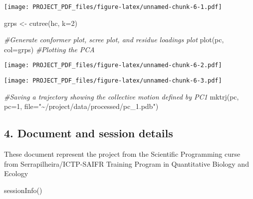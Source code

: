 \documentclass[
]{article}
\newenvironment{Shaded}{\begin{snugshade}}{\end{snugshade}}
\newcommand{\AttributeTok}[1]{\textcolor[rgb]{0.77,0.63,0.00}{#1}}
\newcommand{\CommentTok}[1]{\textcolor[rgb]{0.56,0.35,0.01}{\textit{#1}}}
\newcommand{\DecValTok}[1]{\textcolor[rgb]{0.00,0.00,0.81}{#1}}
\newcommand{\FunctionTok}[1]{\textcolor[rgb]{0.00,0.00,0.00}{#1}}
\newcommand{\NormalTok}[1]{#1}
\newcommand{\OtherTok}[1]{\textcolor[rgb]{0.56,0.35,0.01}{#1}}
\newcommand{\SpecialCharTok}[1]{\textcolor[rgb]{0.00,0.00,0.00}{#1}}
\newcommand{\StringTok}[1]{\textcolor[rgb]{0.31,0.60,0.02}{#1}}
\begin{document}
\texttt{[image: PROJECT\_PDF\_files/figure-latex/unnamed-chunk-6-1.pdf]}

\begin{Shaded}
\begin{Highlighting}[]
\NormalTok{grps }\OtherTok{\textless{}{-}} \FunctionTok{cutree}\NormalTok{(hc, }\AttributeTok{k=}\DecValTok{2}\NormalTok{)}

\CommentTok{\#Generate conformer plot, scree plot, and residue loadings plot}
\FunctionTok{plot}\NormalTok{(pc, }\AttributeTok{col=}\NormalTok{grps) }\CommentTok{\#Plotting the PCA}
\end{Highlighting}
\end{Shaded}

\texttt{[image: PROJECT\_PDF\_files/figure-latex/unnamed-chunk-6-2.pdf]}

\begin{Shaded}
\end{Shaded}

\texttt{[image: PROJECT\_PDF\_files/figure-latex/unnamed-chunk-6-3.pdf]}

\begin{Shaded}
\begin{Highlighting}[]
\CommentTok{\#Saving a  trajectory showing the collective motion defined by PC1}
\FunctionTok{mktrj}\NormalTok{(pc, }\AttributeTok{pc=}\DecValTok{1}\NormalTok{, }\AttributeTok{file=}\StringTok{"\textasciitilde{}/project/data/processed/pc\_1.pdb"}\NormalTok{)}
\end{Highlighting}
\end{Shaded}

\hypertarget{document-and-session-details}{%
\subsection{4. Document and session
details}\label{document-and-session-details}}

These document represent the project from the Scientific Programming
curse from Serrapilheira/ICTP-SAIFR Training Program in Quantitative
Biology and Ecology

\begin{Shaded}
\begin{Highlighting}[]
\FunctionTok{sessionInfo}\NormalTok{()}
\end{Highlighting}
\end{Shaded}
\end{document}

